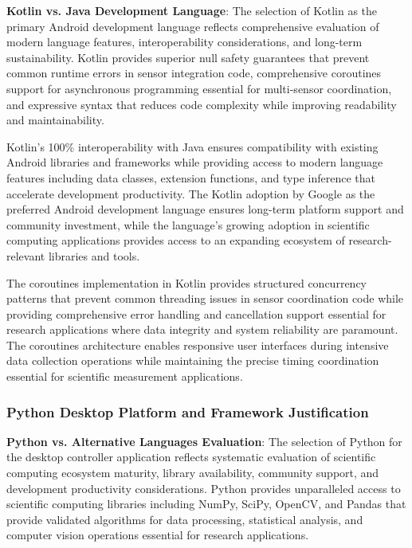 \documentclass[11pt,a4paper]{report}
\begin{document}
\textbf{Kotlin vs. Java Development Language}: The selection of Kotlin as the primary Android development language reflects
comprehensive evaluation of modern language features, interoperability considerations, and long-term sustainability.
Kotlin provides superior null safety guarantees that prevent common runtime errors in sensor integration code,
comprehensive coroutines support for asynchronous programming essential for multi-sensor coordination, and expressive
syntax that reduces code complexity while improving readability and maintainability.

Kotlin's 100\% interoperability with Java ensures compatibility with existing Android libraries and frameworks while
providing access to modern language features including data classes, extension functions, and type inference that
accelerate development productivity. The Kotlin adoption by Google as the preferred Android development language ensures
long-term platform support and community investment, while the language's growing adoption in scientific computing
applications provides access to an expanding ecosystem of research-relevant libraries and tools.

The coroutines implementation in Kotlin provides structured concurrency patterns that prevent common threading issues in
sensor coordination code while providing comprehensive error handling and cancellation support essential for research
applications where data integrity and system reliability are paramount. The coroutines architecture enables responsive
user interfaces during intensive data collection operations while maintaining the precise timing coordination essential
for scientific measurement applications.

\subsubsection{Python Desktop Platform and Framework Justification}

\textbf{Python vs. Alternative Languages Evaluation}: The selection of Python for the desktop controller application reflects
systematic evaluation of scientific computing ecosystem maturity, library availability, community support, and
development productivity considerations. Python provides unparalleled access to scientific computing libraries including
NumPy, SciPy, OpenCV, and Pandas that provide validated algorithms for data processing, statistical analysis, and
computer vision operations essential for research applications.
\end{document}
